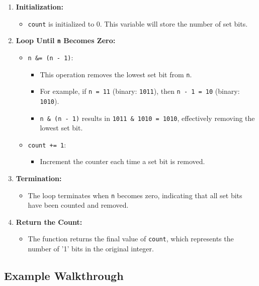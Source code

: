 \begin{enumerate}
    \item \textbf{Initialization:} 
    \begin{itemize}
        \item \texttt{count} is initialized to 0. This variable will store the number of set bits.
    \end{itemize}
    
    \item \textbf{Loop Until \texttt{n} Becomes Zero:}
    \begin{itemize}
        \item \texttt{n \&= (n - 1)}:
        \begin{itemize}
            \item This operation removes the lowest set bit from \texttt{n}.
            \item For example, if \texttt{n = 11} (binary: \texttt{1011}), then \texttt{n - 1 = 10} (binary: \texttt{1010}).
            \item \texttt{n \& (n - 1)} results in \texttt{1011 \& 1010 = 1010}, effectively removing the lowest set bit.
        \end{itemize}
        
        \item \texttt{count += 1}:
        \begin{itemize}
            \item Increment the counter each time a set bit is removed.
        \end{itemize}
    \end{itemize}
    
    \item \textbf{Termination:} 
    \begin{itemize}
        \item The loop terminates when \texttt{n} becomes zero, indicating that all set bits have been counted and removed.
    \end{itemize}
    
    \item \textbf{Return the Count:} 
    \begin{itemize}
        \item The function returns the final value of \texttt{count}, which represents the number of '1' bits in the original integer.
    \end{itemize}
\end{enumerate}

\subsection*{Example Walkthrough}

